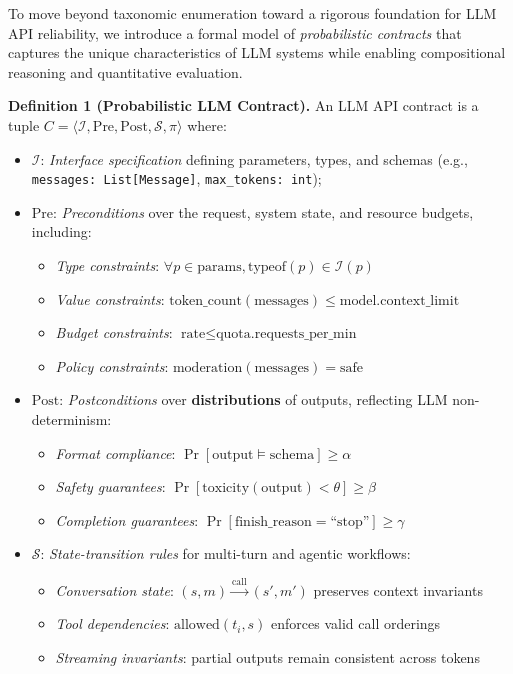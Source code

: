 \documentclass[11pt]{article}
\begin{document}
To move beyond taxonomic enumeration toward a rigorous foundation for LLM API reliability, we introduce a formal model of \textit{probabilistic contracts} that captures the unique characteristics of LLM systems while enabling compositional reasoning and quantitative evaluation.

\textbf{Definition 1 (Probabilistic LLM Contract).} An LLM API contract is a tuple $C = \langle \mathcal{I}, \text{Pre}, \text{Post}, \mathcal{S}, \pi \rangle$ where:

\begin{itemize}
\item $\mathcal{I}$: \textit{Interface specification} defining parameters, types, and schemas (e.g., {\tt messages: List[Message]}, {\tt max\_tokens: int});

\item $\text{Pre}$: \textit{Preconditions} over the request, system state, and resource budgets, including:
  \begin{itemize}
  \item \textit{Type constraints}: $\forall p \in \text{params}, \text{typeof}(p) \in \mathcal{I}(p)$
  \item \textit{Value constraints}: $\text{token\_count}(\text{messages}) \leq \text{model.context\_limit}$
  \item \textit{Budget constraints}: $\text{rate} \leq \text{quota.requests\_per\_min}$
  \item \textit{Policy constraints}: $\text{moderation}(\text{messages}) = \text{safe}$
  \end{itemize}

\item $\text{Post}$: \textit{Postconditions} over \textbf{distributions} of outputs, reflecting LLM non-determinism:
  \begin{itemize}
  \item \textit{Format compliance}: $\Pr[\text{output} \models \text{schema}] \geq \alpha$
  \item \textit{Safety guarantees}: $\Pr[\text{toxicity}(\text{output}) < \theta] \geq \beta$
  \item \textit{Completion guarantees}: $\Pr[\text{finish\_reason} = \text{``stop''}] \geq \gamma$
  \end{itemize}

\item $\mathcal{S}$: \textit{State-transition rules} for multi-turn and agentic workflows:
  \begin{itemize}
  \item \textit{Conversation state}: $(s, m) \xrightarrow{\text{call}} (s', m')$ preserves context invariants
  \item \textit{Tool dependencies}: $\text{allowed}(t_i, s)$ enforces valid call orderings
  \item \textit{Streaming invariants}: partial outputs remain consistent across tokens
  \end{itemize}


\end{itemize}
\end{document}

